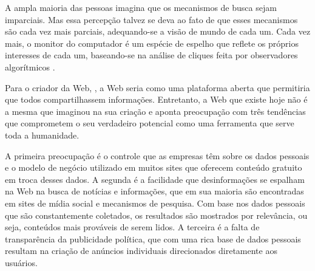 A ampla maioria das pessoas imagina que os mecanismos de busca sejam imparciais. Mas essa percepção talvez se deva ao fato de que esses mecanismos são cada vez mais parciais, adequando-se a visão de mundo de cada um. Cada vez mais, o monitor do computador é um espécie de espelho que reflete os próprios interesses de cada um, baseando-se na análise de cliques feita por observadores algorítmicos \cite{pariser2012}.

Para o criador da Web, \cite{berners2017}, a Web seria como uma plataforma aberta que permitiria que todos compartilhassem informações.  %
Entretanto, a Web que existe hoje não é a mesma que  \cite{berners2017} imaginou na sua criação e aponta preocupação com três tendências que comprometem o seu verdadeiro potencial 
como uma ferramenta que serve toda a humanidade.

A primeira preocupação é o controle que as empresas têm sobre os dados pessoais e o modelo de negócio utilizado em muitos sites que oferecem conteúdo gratuito em troca desses dados. %
A segunda é a facilidade que desinformações se espalham na Web na busca de notícias e informações,%
que em sua maioria são encontradas em sites de mídia social e mecanismos de pesquisa. Com base 
nos dados pessoais que são constantemente coletados, os resultados são mostrados por relevância, ou seja, conteúdos mais prováveis de serem lidos.%
A terceira é a falta de transparência da publicidade política, que com uma rica base de dados pessoais resultam na criação de anúncios individuais direcionados diretamente aos usuários.

